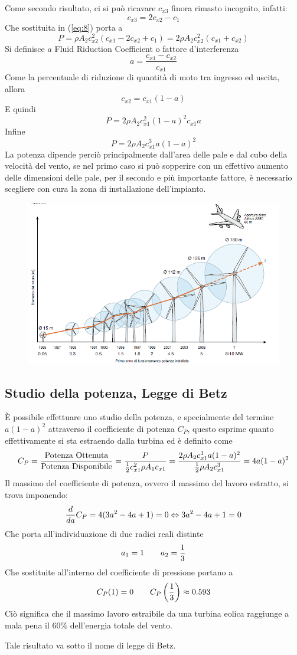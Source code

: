 \documentclass[a4paper, 15pt]{article}
\begin{document}
\begin{adjustwidth}{2in}{}
	Come secondo risultato, ci si può ricavare $c_{x3}$ finora rimasto incognito, infatti: 
	\[c_{x3} = 2c_{x2}-c_{1}\]
	Che sostituita in (\ref{eq:8}) porta a
	\[P = \rho A_2c^2_{x2}(c_{x1}-2c_{x2}+c_{1}) = 2\rho A_2c^2_{x2}(c_{x1}+c_{x2})\]
	Si definisce $a$ Fluid Riduction Coefficient o fattore d'interferenza
	\[a = \dfrac{c_{x1}-c_{x2}}{c_{x1}}\]
	Come la percentuale di riduzione di quantità di moto tra ingresso ed uscita, allora 
	\[c_{x2} = c_{x1}(1-a)\]
	E quindi
	\[P = 2\rho A_2c^2_{x1}(1-a)^2c_{x1}a\]
	Infine 
	\begin{equation}
		\boxed{P = 2\rho A_2 c_{x1}^3a(1-a)^2}
	\end{equation}
	La potenza dipende perciò principalmente dall'area delle pale e dal cubo della  velocità del vento, se nel primo caso si può sopperire con un effettivo aumento delle dimensioni delle pale, per il secondo e più importante fattore, è necessario scegliere con cura la zona di installazione dell'impianto. 
	\begin{figure}[H]
		\centering
		\includegraphics[width=0.5\linewidth]{immagini/eoliche16}
		\label{fig:eoliche16}
	\end{figure}	
\end{adjustwidth}



\subsection{Studio della potenza, Legge di Betz}
\begin{adjustwidth}{2in}{}
	È possibile effettuare uno studio della potenza, e specialmente del termine $a(1-a)^2$ attraverso il coefficiente di potenza $C_P$, questo esprime quanto effettivamente si sta estraendo dalla turbina ed è definito come
	\[C_P=\dfrac{\text{Potenza Ottenuta}}{\text{Potenza Disponibile}} = \dfrac{P}{{1\over2}c^2_{x1}\rho A_1 c_{x1}} = \dfrac{2\rho A_2 c_{x1}^3a(1-a)^2}{{1\over2}\rho A_2 c_{x1}^3} = 4a(1-a)^2\]
	Il massimo del coefficiente di potenza, ovvero il massimo del lavoro estratto, si trova imponendo: 
	\[{d\over da}C_P = 4(3a^2-4a+1)=0 \Leftrightarrow 3a^2-4a+1=0\]
	Che porta all'individuazione di due radici reali distinte
	\[a_1 = 1\qquad a_2 = {1\over3}\]
	Che sostituite all'interno del coefficiente di pressione portano a
	\[C_P(1) = 0 \qquad C_P\left(1\over3\right)\approx0.593\]
	Ciò significa che il massimo lavoro estraibile da una turbina eolica raggiunge a mala pena il 60\% dell'energia totale del vento. 
	
	Tale risultato va sotto il nome di legge di Betz.
\end{adjustwidth}
\end{document}
